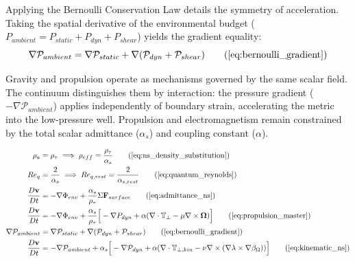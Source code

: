 Applying the Bernoulli Conservation Law details the symmetry of acceleration. Taking the spatial derivative of the environmental budget ($P_{ambient} = P_{static} + P_{dyn} + P_{shear}$) yields the gradient equality: 
\begin{equation}
    \nabla \mathcal{P}_{ambient} = \nabla \mathcal{P}_{static} + \nabla(\mathcal{P}_{dyn} + \mathcal{P}_{shear}) \tag{\ref{eq:bernoulli_gradient}}
\end{equation}

Gravity and propulsion operate as mechanisms governed by the same scalar field. The continuum distinguishes them by interaction: the pressure gradient ($-\nabla \mathcal{P}_{ambient}$) applies independently of boundary strain, accelerating the metric into the low-pressure well. Propulsion and electromagnetism remain constrained by the total scalar admittance ($\alpha_s$) and coupling constant ($\alpha$). %

\begin{tcolorbox}[recallbox, title={\ref{box:admittance_ns}. Compliance-Modified Navier-Stokes \hfill\makebox[0pt][r]{}}]
\begin{align}
    \rho_a &= \rho_\tau \implies \rho_{eff} = \frac{\rho_\tau}{\alpha_s} \tag{\ref{eq:ns_density_substitution}} \\ 
    Re_q &= \frac{2}{\alpha_s} \implies Re_{q,rest} = \frac{2}{\alpha_{s,rest}} \tag{\ref{eq:quantum_reynolds}} \\ 
    \frac{D\mathbf{v}}{Dt} &= -\nabla \Phi_{env} + \frac{\alpha_s}{\rho_\tau} \Sigma \mathbf{F}_{surface} \tag{\ref{eq:admittance_ns}} \\ 
    \frac{D\mathbf{v}}{Dt} &= -\nabla \Phi_{env} + \frac{\alpha_s}{\rho_\tau} \Big[ -\nabla P_{dyn} + \alpha(\nabla \cdot \mathbb{T}_{\perp} - \mu \nabla \times \boldsymbol{\Omega}) \Big] \tag{\ref{eq:propulsion_master}} \\ 
    \nabla \mathcal{P}_{ambient} &= \nabla \mathcal{P}_{static} + \nabla(\mathcal{P}_{dyn} + \mathcal{P}_{shear}) \tag{\ref{eq:bernoulli_gradient}} \\
    \frac{D\mathbf{v}}{Dt} &= -\nabla \mathcal{P}_{ambient} + \alpha_s \Big[ -\nabla \mathcal{P}_{dyn} + \alpha(\nabla \cdot \mathbb{T}_{\perp, kin} - \nu \nabla \times (\nabla\lambda \times \nabla\beta_\Omega)) \Big] \tag{\ref{eq:kinematic_ns}} 
\end{align}
\end{tcolorbox}


